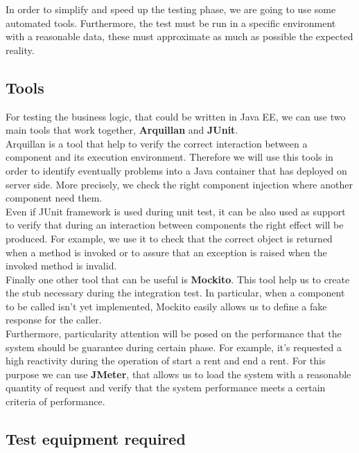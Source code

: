 In order to simplify and speed up the testing phase, we are going to use some automated tools.
Furthermore, the test must be run in a specific environment with a reasonable data, these must approximate as much as possible the expected reality.

\subsection{Tools}

For testing the business logic, that could be written in Java EE, we can use two main tools that work together, \textbf{Arquillan} and \textbf{JUnit}.\\
Arquillan is a tool that help to verify the correct interaction between a component and its execution environment. Therefore we will use this tools in order to identify eventually problems into a Java container that has deployed on server side. More precisely, we check the right component injection where another component need them.\\
Even if JUnit framework is used during unit test, it can be also used as support to verify that during an interaction between components the right effect will be produced. For example, we use it to check that the correct object is returned when a method is invoked or to assure that an exception is raised when the invoked method is invalid.\\
Finally one other tool that can be useful is \textbf{Mockito}. This tool help us to create the stub necessary during the integration test. In particular, when a component to be called isn't yet implemented, Mockito easily allows us to define a fake response for the caller.\\
Furthermore, particularity attention will be posed on the performance that the system should be guarantee during certain phase. For example, it's requested a high reactivity during the operation of start a rent and end a rent. For this purpose we can use \textbf{JMeter}, that allows us to load the system with a reasonable quantity of request and verify that the system performance meets a certain criteria of performance.


\subsection{Test equipment required}

